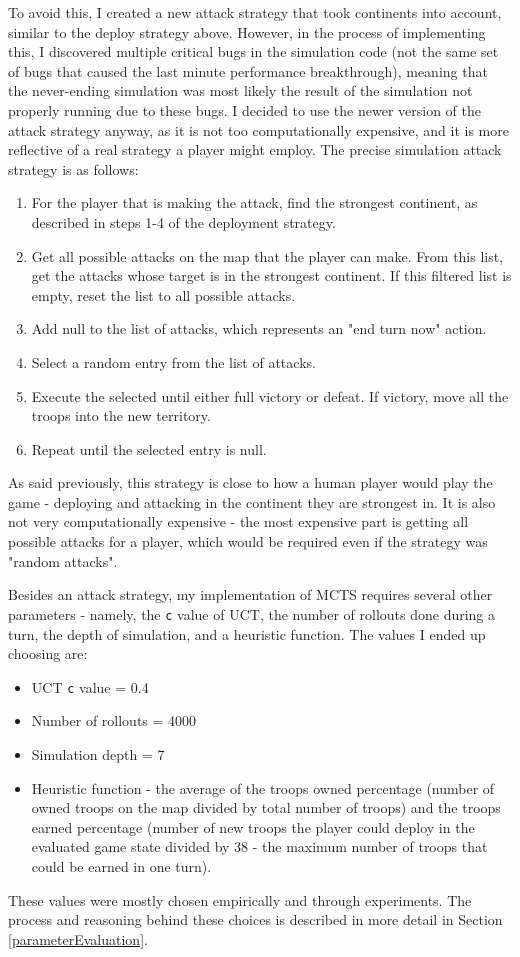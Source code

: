 To avoid this, I created a new attack strategy that took continents into account, similar to the deploy strategy above. However, in the process of implementing this, I discovered multiple critical bugs in the simulation code (not the same set of bugs that caused the last minute performance breakthrough), meaning that the never-ending simulation was most likely the result of the simulation not properly running due to these bugs. I decided to use the newer version of the attack strategy anyway, as it is not too computationally expensive, and it is more reflective of a real strategy a player might employ. The precise simulation attack strategy is as follows:
\begin{enumerate}
\item For the player that is making the attack, find the strongest continent, as described in steps 1-4 of the deployment strategy.
\item Get all possible attacks on the map that the player can make. From this list, get the attacks whose target is in the strongest continent. If this filtered list is empty, reset the list to all possible attacks.
\item Add null to the list of attacks, which represents an "end turn now" action.
\item Select a random entry from the list of attacks.
\item Execute the selected until either full victory or defeat. If victory, move all the troops into the new territory.
\item Repeat until the selected entry is null.
\end{enumerate}

As said previously, this strategy is close to how a human player would play the game - deploying and attacking in the continent they are strongest in. It is also not very computationally expensive - the most expensive part is getting all possible attacks for a player, which would be required even if the strategy was "random attacks".

Besides an attack strategy, my implementation of MCTS requires several other parameters - namely, the \texttt{c} value of UCT, the number of rollouts done during a turn, the depth of simulation, and a heuristic function. The values I ended up choosing are:
\begin{itemize}
\item UCT \texttt{c} value = 0.4
\item Number of rollouts = 4000
\item Simulation depth = 7
\item Heuristic function - the average of the troops owned percentage (number of owned troops on the map divided by total number of troops) and the troops earned percentage (number of new troops the player could deploy in the evaluated game state divided by 38 - the maximum number of troops that could be earned in one turn).
\end{itemize}
These values were mostly chosen empirically and through experiments. The process and reasoning behind these choices is described in more detail in Section \ref{parameterEvaluation}.
